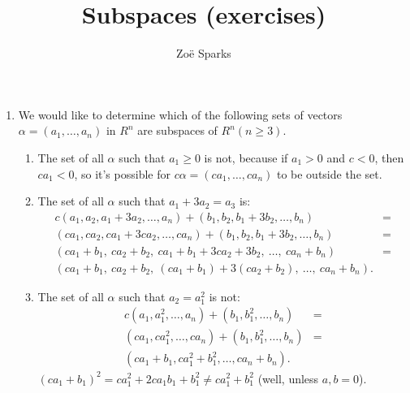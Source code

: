 \documentclass[12pt]{article}
\title{Subspaces (exercises)}
\author{Zoë Sparks}
\begin{document}
\theoremstyle{definition}

\newtheorem{thm}{Theorem}
\newtheorem*{nthm}{Theorem}
\newtheorem{sthm}{}[thm]
\newtheorem{lemma}{Lemma}[thm]
\newtheorem*{nlemma}{Lemma}
\newtheorem{cor}{Corollary}[thm]
\newtheorem*{prop}{Property}
\newtheorem*{defn}{Definition}
\newtheorem*{comm}{Comment}
\newtheorem*{exm}{Example}

\maketitle

\begin{enumerate}
  \item
    We would like to determine which of the following sets of vectors $\alpha =
    (a_1,\ldots,a_n)$ in $R^n$ are subspaces of $R^n (n \geq 3)$.
    \begin{enumerate}
      \item
        The set of all $\alpha$ such that $a_1 \geq 0$ is not, because if $a_1 > 0$
        and $c < 0$, then $ca_1 < 0$, so it's possible for $c\alpha =
        (ca_1,\ldots,ca_n)$ to be outside the set.

      \item
        The set of all $\alpha$ such that $a_1 + 3a_2 = a_3$ is:
        \begin{align*}
          c(a_1,a_2,a_1 + 3a_2,\ldots,a_n) + (b_1,b_2,b_1 + 3b_2,\ldots,b_n) &=\\
          (ca_1,ca_2,ca_1 + 3ca_2,\ldots,ca_n) + (b_1,b_2,b_1 + 3b_2,\ldots,b_n) &=\\
          (ca_1+b_1,\ ca_2+b_2,\ ca_1+b_1 + 3ca_2+3b_2,\ \ldots,\ ca_n + b_n) &=\\
          (ca_1+b_1,\ ca_2+b_2,\ (ca_1+b_1) + 3(ca_2+b_2),\ \ldots,\ ca_n + b_n).
        \end{align*}

      \item
        The set of all $\alpha$ such that $a_2 = a_1^2$ is not:
        \begin{align*}
          c(a_1,a_1^2,\ldots,a_n) + (b_1,b_1^2,\ldots,b_n) &=\\
          (ca_1,ca_1^2,\ldots,ca_n) + (b_1,b_1^2,\ldots,b_n) &=\\
          (ca_1+b_1,ca_1^2+b_1^2,\ldots,ca_n+b_n).
        \end{align*}
        $(ca_1+b_1)^2 = ca_1^2 + 2ca_1b_1 + b_1^2 \neq ca_1^2+b_1^2$ (well, unless
        $a,b = 0$).


\end{enumerate}
\end{enumerate}
\end{document}
